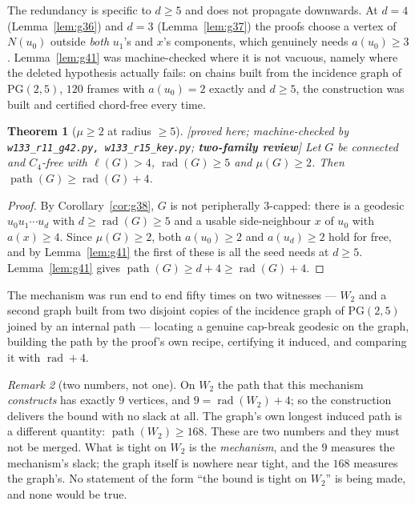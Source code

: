 \documentclass[11pt]{article}
\theoremstyle{plain}
\newtheorem{theorem}{Theorem}[section]
\theoremstyle{definition}
\theoremstyle{remark}
\newtheorem{remark}[theorem]{Remark}
\numberwithin{equation}{section}
\newcommand{\rad}{\operatorname{rad}}
\newcommand{\pth}{\operatorname{path}}
\newcommand{\statusbox}[1]{{\small\sloppy\textsf{[#1]}}}
\newcommand{\REV}[1]{\statusbox{proved here; machine-checked by \texttt{#1};
\textbf{two-family review}}}
\begin{document}
The redundancy is specific to $d \ge 5$ and does not propagate downwards. At $d = 4$
(Lemma~\ref{lem:g36}) and $d = 3$ (Lemma~\ref{lem:g37}) the proofs choose a vertex of
$N(u_0)$ outside \emph{both} $u_1$'s and $x$'s components, which genuinely needs
$a(u_0)\ge 3$. Lemma~\ref{lem:g41} was machine-checked where it is not vacuous, namely where
the deleted hypothesis actually fails: on chains built from the incidence graph of
$\mathrm{PG}(2,5)$, $120$ frames with $a(u_0) = 2$ exactly and $d \ge 5$, the construction was
built and certified chord-free every time.

\begin{theorem}[$\mu \ge 2$ at radius $\ge 5$]\label{thm:g42}
\REV{w133\_r11\_g42.py, w133\_r15\_key.py}
Let $G$ be connected and $C_4$-free with $\ell(G) > 4$, $\rad(G)\ge 5$ and $\mu(G)\ge 2$.
Then $\pth(G) \ge \rad(G) + 4$.
\end{theorem}

\begin{proof}
By Corollary~\ref{cor:g38}, $G$ is not peripherally $3$-capped: there is a geodesic
$u_0u_1\cdots u_d$ with $d \ge \rad(G)\ge 5$ and a usable side-neighbour $x$ of $u_0$ with
$a(x)\ge 4$. Since $\mu(G)\ge 2$, both $a(u_0)\ge 2$ and $a(u_d)\ge 2$ hold for free, and by
Lemma~\ref{lem:g41} the first of these is all the seed needs at $d \ge 5$. Lemma~\ref{lem:g41}
gives $\pth(G)\ge d + 4 \ge \rad(G)+4$.
\end{proof}

The mechanism was run end to end fifty times on two witnesses --- $W_2$ and a second graph
built from two disjoint copies of the incidence graph of $\mathrm{PG}(2,5)$ joined by an
internal path --- locating a genuine cap-break geodesic on the graph, building the path by the
proof's own recipe, certifying it induced, and comparing it with $\rad + 4$.

\begin{remark}[two numbers, not one]\label{rem:twonumbers}
On $W_2$ the path that this mechanism \emph{constructs} has exactly $9$ vertices, and
$9 = \rad(W_2)+4$; so the construction delivers the bound with no slack at all. The graph's
own longest induced path is a different quantity: $\pth(W_2)\ge 168$. These are two numbers
and they must not be merged. What is tight on $W_2$ is the \emph{mechanism}, and the $9$
measures the mechanism's slack; the graph itself is nowhere near tight, and the $168$ measures
the graph's. No statement of the form ``the bound is tight on $W_2$'' is being made, and none
would be true.
\end{remark}
\end{document}
